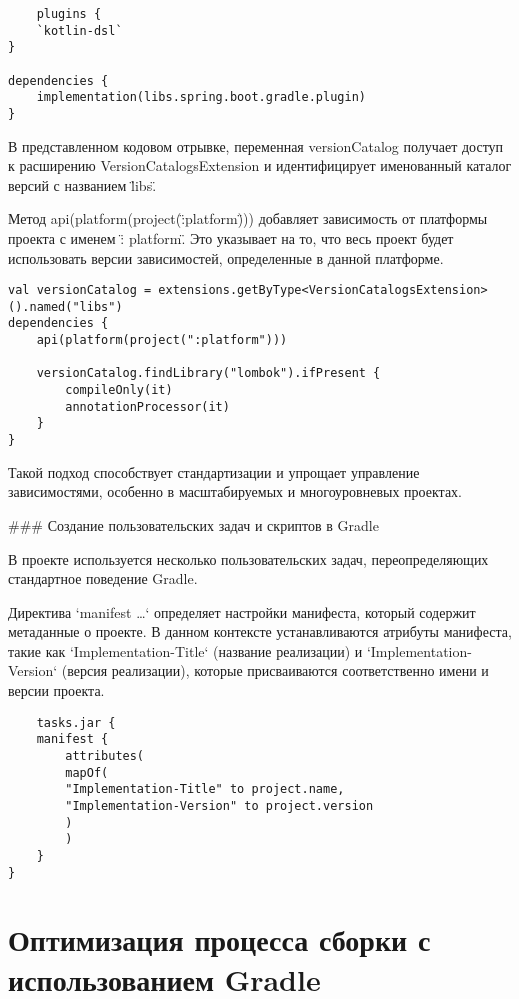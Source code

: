 \begin{lstlisting}
    plugins {
    `kotlin-dsl`
}

dependencies {
    implementation(libs.spring.boot.gradle.plugin)
}
\end{lstlisting}


В представленном кодовом отрывке, переменная versionCatalog получает доступ к расширению
VersionCatalogsExtension и идентифицирует именованный каталог версий с названием \"libs\".

Метод api(platform(project(\":platform\"))) добавляет зависимость от платформы проекта с именем \":
platform\".
Это указывает на то, что весь проект будет использовать версии зависимостей, определенные
в данной платформе.

\begin{lstlisting}[label={lst:lstlisting}]
    val versionCatalog = extensions.getByType<VersionCatalogsExtension>().named("libs")
dependencies {
    api(platform(project(":platform")))

    versionCatalog.findLibrary("lombok").ifPresent {
        compileOnly(it)
        annotationProcessor(it)
    }
}
\end{lstlisting}



Такой подход способствует стандартизации и упрощает управление зависимостями, особенно в
масштабируемых и многоуровневых проектах.

\#\#\# Создание пользовательских задач и скриптов в Gradle

В проекте используется несколько пользовательских задач, переопределяющих стандартное поведение
Gradle.

Директива `manifest {\ldots }` определяет настройки манифеста, который содержит метаданные о проекте.
В данном контексте устанавливаются атрибуты манифеста, такие как `Implementation-Title` (название
реализации) и `Implementation-Version` (версия реализации), которые присваиваются соответственно
имени и версии проекта.

\begin{lstlisting}
    tasks.jar {
    manifest {
        attributes(
        mapOf(
        "Implementation-Title" to project.name,
        "Implementation-Version" to project.version
        )
        )
    }
}
\end{lstlisting}


\section{Оптимизация процесса сборки с использованием Gradle}\label{sec:-----gradle}

